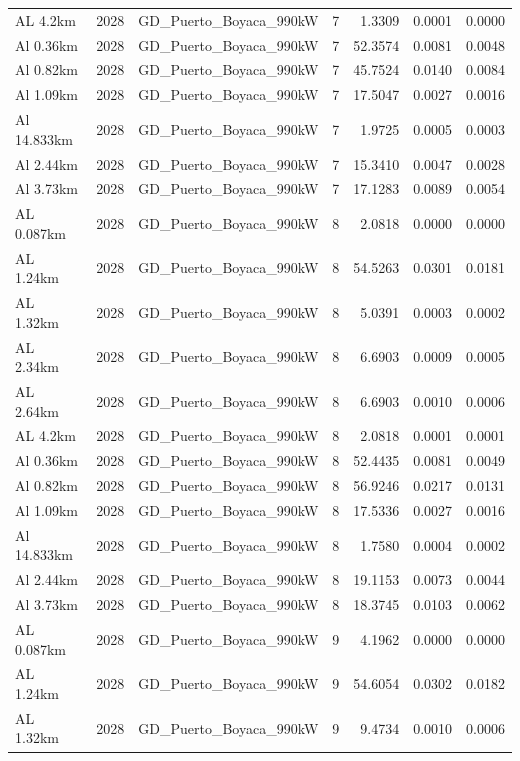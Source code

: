 \documentclass[11pt,a4paper]{article}
\begin{document}
\begin{longtable}{llllrrr}
AL 4.2km & 2028 & GD\_Puerto\_Boyaca\_990kW & 7 & 1.3309 & 0.0001 & 0.0000 \\
Al 0.36km & 2028 & GD\_Puerto\_Boyaca\_990kW & 7 & 52.3574 & 0.0081 & 0.0048 \\
Al 0.82km & 2028 & GD\_Puerto\_Boyaca\_990kW & 7 & 45.7524 & 0.0140 & 0.0084 \\
Al 1.09km & 2028 & GD\_Puerto\_Boyaca\_990kW & 7 & 17.5047 & 0.0027 & 0.0016 \\
Al 14.833km & 2028 & GD\_Puerto\_Boyaca\_990kW & 7 & 1.9725 & 0.0005 & 0.0003 \\
Al 2.44km & 2028 & GD\_Puerto\_Boyaca\_990kW & 7 & 15.3410 & 0.0047 & 0.0028 \\
Al 3.73km & 2028 & GD\_Puerto\_Boyaca\_990kW & 7 & 17.1283 & 0.0089 & 0.0054 \\
AL 0.087km & 2028 & GD\_Puerto\_Boyaca\_990kW & 8 & 2.0818 & 0.0000 & 0.0000 \\
AL 1.24km & 2028 & GD\_Puerto\_Boyaca\_990kW & 8 & 54.5263 & 0.0301 & 0.0181 \\
AL 1.32km & 2028 & GD\_Puerto\_Boyaca\_990kW & 8 & 5.0391 & 0.0003 & 0.0002 \\
AL 2.34km & 2028 & GD\_Puerto\_Boyaca\_990kW & 8 & 6.6903 & 0.0009 & 0.0005 \\
AL 2.64km & 2028 & GD\_Puerto\_Boyaca\_990kW & 8 & 6.6903 & 0.0010 & 0.0006 \\
AL 4.2km & 2028 & GD\_Puerto\_Boyaca\_990kW & 8 & 2.0818 & 0.0001 & 0.0001 \\
Al 0.36km & 2028 & GD\_Puerto\_Boyaca\_990kW & 8 & 52.4435 & 0.0081 & 0.0049 \\
Al 0.82km & 2028 & GD\_Puerto\_Boyaca\_990kW & 8 & 56.9246 & 0.0217 & 0.0131 \\
Al 1.09km & 2028 & GD\_Puerto\_Boyaca\_990kW & 8 & 17.5336 & 0.0027 & 0.0016 \\
Al 14.833km & 2028 & GD\_Puerto\_Boyaca\_990kW & 8 & 1.7580 & 0.0004 & 0.0002 \\
Al 2.44km & 2028 & GD\_Puerto\_Boyaca\_990kW & 8 & 19.1153 & 0.0073 & 0.0044 \\
Al 3.73km & 2028 & GD\_Puerto\_Boyaca\_990kW & 8 & 18.3745 & 0.0103 & 0.0062 \\
AL 0.087km & 2028 & GD\_Puerto\_Boyaca\_990kW & 9 & 4.1962 & 0.0000 & 0.0000 \\
AL 1.24km & 2028 & GD\_Puerto\_Boyaca\_990kW & 9 & 54.6054 & 0.0302 & 0.0182 \\
AL 1.32km & 2028 & GD\_Puerto\_Boyaca\_990kW & 9 & 9.4734 & 0.0010 & 0.0006 \\

\end{longtable}
\end{document}
